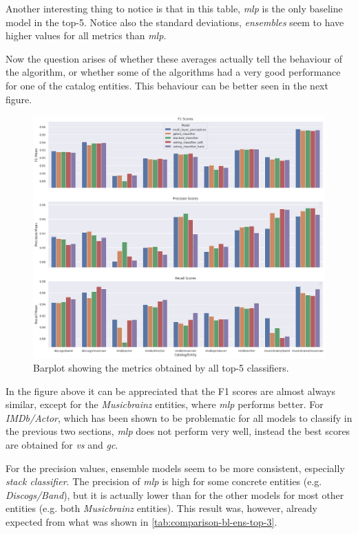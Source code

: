 \documentclass[epsfig,a4paper,11pt,titlepage,twoside,openany]{book}
\begin{document}
Another interesting thing to notice is that in this table, \textit{mlp} is the only baseline model in the top-5. Notice also the standard deviations, \textit{ensembles} seem to have higher values for all metrics than \textit{mlp}. 

Now the question arises of whether these averages actually tell the behaviour of the algorithm, or whether some of the algorithms had a very good performance for one of the catalog entities. This behaviour can be better seen in the next figure.

\begin{figure}[H]
  \centering \includegraphics[width=\textwidth]{comparison_barplots_all_metrics} 
  \caption{Barplot showing the metrics obtained by all top-5 classifiers.}
  \label{fig:comparison-barplot-all-metrics}
\end{figure}

In the figure above it can be appreciated that the F1 scores are almost always similar, except for the \textit{Musicbrainz} entities, where \textit{mlp} performs better. For \textit{IMDb/Actor}, which has been shown to be problematic for all models to classify in the previous two sections, \textit{mlp} does not perform very well, instead the best scores are obtained for \textit{vs} and \textit{gc}.

For the precision values, ensemble models seem to be more consistent, especially \textit{stack classifier}. The precision of \textit{mlp} is high for some concrete entities (e.g. \textit{Discogs/Band}), but it is actually lower than for the other models for most other entities (e.g. both \textit{Musicbrainz} entities). This result was, however, already expected from what was shown in \autoref{tab:comparison-bl-ens-top-3}.
\end{document}
